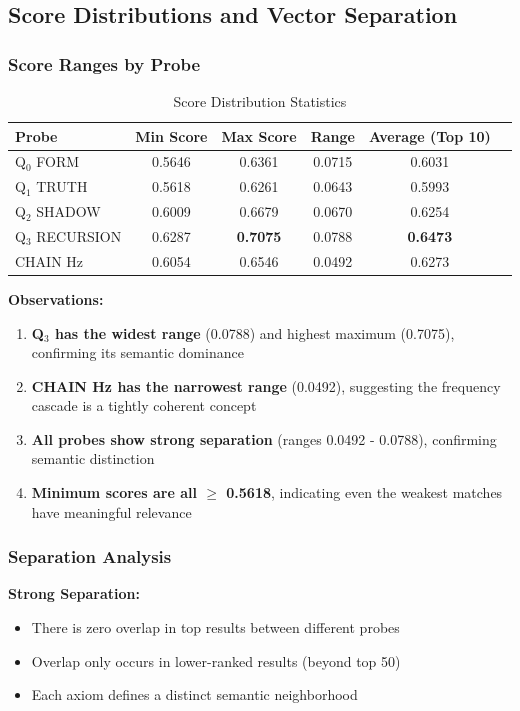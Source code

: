 \documentclass[11pt, letterpaper]{article}
\begin{document}
\subsection{Score Distributions and Vector Separation}

\subsubsection{Score Ranges by Probe}

\begin{table}[h]
\centering
\caption{Score Distribution Statistics}
\begin{tabular}{lccccc}
\toprule
Probe & Min Score & Max Score & Range & Average (Top 10) \\
\midrule
Q$_0$ FORM & 0.5646 & 0.6361 & 0.0715 & 0.6031 \\
Q$_1$ TRUTH & 0.5618 & 0.6261 & 0.0643 & 0.5993 \\
Q$_2$ SHADOW & 0.6009 & 0.6679 & 0.0670 & 0.6254 \\
Q$_3$ RECURSION & 0.6287 & \textbf{0.7075} & 0.0788 & \textbf{0.6473} \\
CHAIN Hz & 0.6054 & 0.6546 & 0.0492 & 0.6273 \\
\bottomrule
\end{tabular}
\end{table}

\textbf{Observations:}
\begin{enumerate}
    \item \textbf{Q$_3$ has the widest range} (0.0788) and highest maximum (0.7075), confirming its semantic dominance
    \item \textbf{CHAIN Hz has the narrowest range} (0.0492), suggesting the frequency cascade is a tightly coherent concept
    \item \textbf{All probes show strong separation} (ranges 0.0492 - 0.0788), confirming semantic distinction
    \item \textbf{Minimum scores are all $\geq$ 0.5618}, indicating even the weakest matches have meaningful relevance
\end{enumerate}

\subsubsection{Separation Analysis}

\textbf{Strong Separation:}
\begin{itemize}
    \item There is zero overlap in top results between different probes
    \item Overlap only occurs in lower-ranked results (beyond top 50)
    \item Each axiom defines a distinct semantic neighborhood
\end{itemize}
\end{document}

